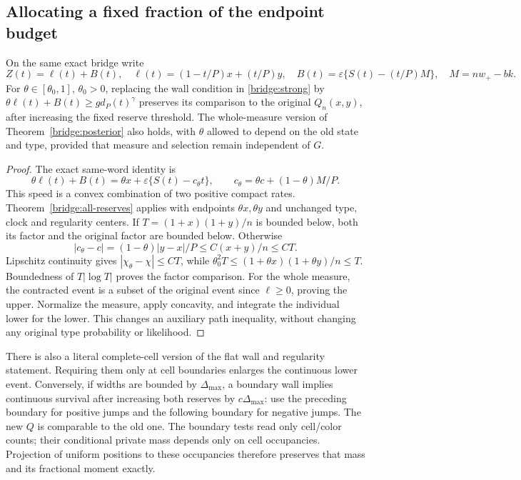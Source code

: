\subsection{Allocating a fixed fraction of the endpoint budget}

\begin{corollary}\label{bridge:contracted}
On the same exact bridge write
\[
 Z(t)=\ell(t)+B(t),\quad
 \ell(t)=(1-t/P)x+(t/P)y,\quad
 B(t)=\varepsilon\{S(t)-(t/P)M\},\quad M=nw_+-bk.
\]
For $\theta\in[\theta_0,1]$, $\theta_0>0$, replacing the wall
condition in \eqref{bridge:strong} by
$\theta\ell(t)+B(t)\ge gd_P(t)^\gamma$ preserves its comparison
to the original $Q_n(x,y)$, after increasing the fixed reserve
threshold. The whole-measure version of Theorem~\ref{bridge:posterior}
also holds, with $\theta$ allowed to depend on the old state and type,
provided that measure and selection remain independent of $G$.
\end{corollary}
\begin{proof}
The exact same-word identity is
\[
 \theta\ell(t)+B(t)
 =\theta x+\varepsilon\{S(t)-c_\theta t\},\qquad
 c_\theta=\theta c+(1-\theta)M/P.
\]
This speed is a convex combination of two positive compact rates.
Theorem~\ref{bridge:all-reserves} applies with endpoints
$\theta x,\theta y$ and unchanged type, clock and regularity centers.
If $T=(1+x)(1+y)/n$ is bounded below, both its factor and the
original factor are bounded below. Otherwise
\[
 |c_\theta-c|=(1-\theta)|y-x|/P\le C(x+y)/n\le CT.
\]
Lipschitz continuity gives $|\chi_\theta-\chi|\le CT$, while
$\theta_0^2T\le(1+\theta x)(1+\theta y)/n\le T$.
Boundedness of $T|\log T|$ proves the factor comparison.
For the whole measure, the contracted event is a subset of the
original event since $\ell\ge0$, proving the upper. Normalize the
measure, apply concavity, and integrate the individual lower for the
lower. This changes an auxiliary path inequality, without changing
any original type probability or likelihood.
\end{proof}

There is also a literal complete-cell version of the flat wall and
regularity statement. Requiring them only at cell boundaries enlarges
the continuous lower event. Conversely, if widths are bounded by
$\Delta_{\max}$, a boundary wall implies continuous survival after
increasing both reserves by $c\Delta_{\max}$: use the preceding
boundary for positive jumps and the following boundary for negative
jumps. The new $Q$ is comparable to the old one. The boundary tests
read only cell/color counts; their conditional private mass depends
only on cell occupancies. Projection of uniform positions to these
occupancies therefore preserves that mass and its fractional moment
exactly.

